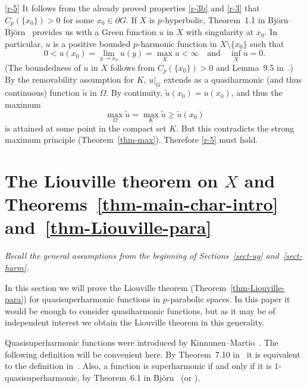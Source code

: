 \documentclass[a4paper,twoside]{article}
\makeatletter
\theoremstyle{propositional}
\theoremstyle{descriptive}
\theoremstyle{remarkstyle}
\renewenvironment{proof}[1][\proofname]{\par
  \pushQED{\qed}%
  \normalfont
  \trivlist
  \item[\hskip\labelsep
        \itshape
    #1\@addpunct{.}]\ignorespaces
}{%
  \popQED\endtrivlist\@endpefalse
}
\newcommand{\setm}{\setminus}
\newcommand{\Cp}{{C_p}}
\newcommand{\bdry}{\partial}
\newcommand{\bdy}{\bdry}
\newcommand{\Om}{\Omega}
\newcommand{\p}{{$p\mspace{1mu}$}}
\newcommand{\ut}{\tilde{u}}
\numberwithin{equation}{section}
\makeatother
\begin{document}
\begin{proof}
\ref{r-5} 
It follows from  the already proved properties \ref{r-3b} 
and \ref{r-3} that $\Cp(\{x_0\})>0$ for some $x_0\in \bdy G$.
If $X$ is \p-hyperbolic,
Theorem~1.1 in Bj\"orn--Bj\"orn~\cite{BBglobal}
provides us with a  Green function $u$ in $X$ with singularity at $x_0$.
In particular, $u$ is 
a positive bounded \p-harmonic function in $X \setm \{x_0\}$
such that
\[
0 < u(x_0) = \lim_{y\to x_0}u(y) = \max_{X} u < \infty
\quad \text{and} \quad
\inf_X u=0.
\]
(The boundedness of $u$ in $X$
follows from 
$\Cp(\{x_0\})>0$ and Lemma~9.5 in~\cite{BBglobal}.)
By the removability assumption for $K$, 
 $u|_G$ extends as a 
quasiharmonic (and thus continuous) function $\ut$ 
in $\Om$.  
By continuity, $\ut(x_0)=u(x_0)$, and thus the  maximum 
\[
   \max_\Om \ut = \max_K \ut \ge
\ut(x_0)
\]
is attained at some point in the compact set $K$.
But this contradicts the strong maximum principle
(Theorem~\ref{thm-max}).
Therefore  \ref{r-5} must hold.
\end{proof}  





\section{The Liouville theorem on \texorpdfstring{$X$}{X}
and Theorems~\ref{thm-main-char-intro} and~\ref{thm-Liouville-para}}
\label{sect-Liouville}

\emph{Recall the general assumptions from the beginning of Sections~\ref{sect-ug}
and~\ref{sect-harm}.}

\medskip


In this section we will 
prove the Liouville theorem (Theorem~\ref{thm-Liouville-para})
for quasisuperharmonic functions in \p-parabolic spaces.
In this paper it would be enough to consider 
quasiharmonic functions, but as it may be of
independent interest we obtain 
the Liouville theorem in this generality.

Quasisuperharmonic functions were introduced by 
Kinnunen--Martio~\cite[Definition~7.1]{KiMa03}.
The following definition will be convenient here.
By Theorem~7.10 in~\cite{KiMa03} it is equivalent to the definition in~\cite{KiMa03}.
Also, a function is superharmonic if and only if it is $1$-quasisuperharmonic, 
by Theorem~6.1 in Bj\"orn~\cite{ABsuper} (or \cite[Theorem~9.24]{BBbook}).
\end{document}
